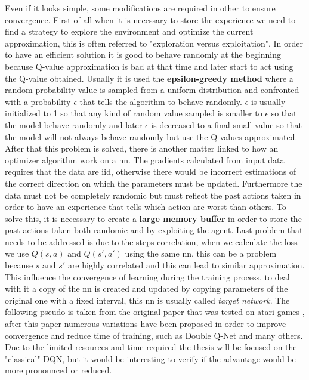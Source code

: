 Even if it looks simple, some modifications are required in other to ensure convergence.
First of all when it is necessary to store the experience we need to find a strategy to explore the environment and optimize the current approximation, this is often referred to "exploration versus exploitation". In order to have an efficient solution it is good to behave randomly at the beginning because Q-value approximation is bad at that time and later start to act using the Q-value obtained. Usually it is used the \textbf{epsilon-greedy method} where a random probability value is sampled from a uniform distribution and confronted with a probability $\epsilon$  that tells the algorithm to behave randomly. $\epsilon$ is usually initialized to 1 so that any kind of random value sampled is smaller to $\epsilon$ so that the model behave randomly and later $\epsilon$ is decreased to a final small value so that the model will not always behave randomly but use the Q-values approximated. 
After that this problem is solved, there is another matter linked to how an optimizer algorithm work on a \acrshort{nn}. The gradients calculated from input data requires that the data are \acrshort{iid}, otherwise there would be incorrect estimations of the correct direction on which the parameters must be updated. Furthermore the data must not be completely randomic but must reflect the past actions taken in order to have an experience that tells which action are worst than others. To solve this, it is necessary to create a \textbf{large memory buffer} in order to store the past actions taken both randomic and by exploiting the agent.
Last problem that needs to be addressed is due to the steps correlation, when we calculate the loss we use $Q(s,a)$ and $Q(s',a')$ using the same \acrshort{nn}, this can be a problem because $s$ and $s'$ are highly correlated and this can lead to similar approximation. This influence the convergence of learning during the training process, to deal with it a copy of the \acrshort{nn} is created and updated by copying parameters of the original one with a fixed interval, this \acrshort{nn} is usually called \textit{target network}.
The following pseudo is taken from the original paper that was tested on atari games \cite{DBLP:journals/corr/MnihKSGAWR13}, after this paper numerous variations have been proposed in order to improve convergence and reduce time of training, such as Double Q-Net \cite{DBLP:journals/corr/HasseltGS15} and many others. Due to the limited resources and time required the thesis will be focused on the "classical" DQN, but it would be interesting to verify if the advantage would be more pronounced or reduced.
